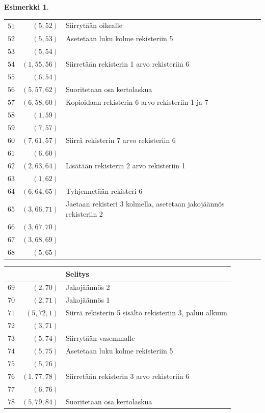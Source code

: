 \documentclass[a4paper, 12pt]{article}
\theoremstyle{definition}
\newtheorem{example}[mydef]{Esimerkki}
\theoremstyle{plain}
\begin{document}
\begin{example}
\begin{center}
\begin{tabular}[t]{r|r|l}
$\hat{51}$ & $(5, 52)$  & Siirrytään oikealle\\
$\hat{52}$ & $(5, 53)$  & Asetetaan luku kolme rekisteriin 5\\
$\hat{53}$ & $(5, 54)$  &\\
$\hat{54}$ & $(1, 55, 56)$  & Siirretään rekisterin 1 arvo rekisteriin 6 \\
$\hat{55}$ & $(6, 54)$  &\\
$\hat{56}$ & $(5, 57, 62)$  & Suoritetaan osa kertolaskua\\
$\hat{57}$ & $(6, 58, 60)$  & Kopioidaan rekisterin 6 arvo rekisteriin 1 ja 7\\
$\hat{58}$ & $(1, 59)$  &\\
$\hat{59}$ & $(7, 57)$  &\\
$\hat{60}$ & $(7, 61, 57)$ & Siirrä rekisterin 7 arvo rekisteriin 6 \\
$\hat{61}$ & $(6, 60)$  &\\
$\hat{62}$ & $(2, 63, 64)$  & Lisätään rekisterin 2 arvo rekisteriin 1\\
$\hat{63}$ & $(1, 62)$  &\\
$\hat{64}$ & $(6, 64, 65)$  & Tyhjennetään rekisteri 6\\
$\hat{65}$ & $(3, 66, 71)$  & Jaetaan rekisteri 3 kolmella, asetetaan jakojäännös rekisteriin 2\\
$\hat{66}$ & $(3, 67, 70)$  & \\
$\hat{67}$ & $(3, 68, 69)$  & \\
$\hat{68}$ & $(5, 65)$  & \\
\end{tabular}
\begin{tabular}[t]{r|r|l}
& & Selitys\\
\hline
$\hat{69}$ & $(2, 70)$  & Jakojäännös 2 \\
$\hat{70}$ & $(2, 71)$  & Jakojäännös 1 \\
$\hat{71}$ & $(5, 72, 1)$  & Siirrä rekisterin 5 sisältö rekisteriin 3, paluu alkuun \\
$\hat{72}$ & $(3, 71)$  & \\
$\hat{73}$ & $(5, 74)$  & Siirrytään vasemmalle\\
$\hat{74}$ & $(5, 75)$  & Asetetaan luku kolme rekisteriin 5\\
$\hat{75}$ & $(5, 76)$  &\\
$\hat{76}$ & $(1, 77, 78)$  & Siirretään rekisterin 3 arvo rekisteriin 6 \\
$\hat{77}$ & $(6, 76)$  &\\
$\hat{78}$ & $(5, 79, 84)$  & Suoritetaan osa kertolaskua\\

\end{tabular}
\end{center}
\end{example}
\end{document}
